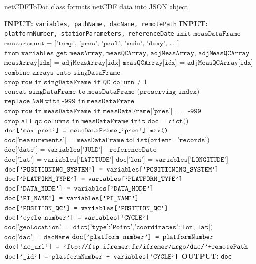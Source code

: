 \begin{algorithm}
\caption{netCDFToDoc class formats netCDF data into JSON object}\label{alg:netCDFToDoc}
\begin{algorithmic}[1]
\State \textbf{INPUT:} \texttt{variables, pathName, dacName, remotePath}
\State \textbf{INPUT:} \texttt{platformNumber, stationParameters, referenceDate}
\State $\texttt{init measDataFrame}$
\State $\texttt{measurement = ['temp', 'pres', 'psal', 'cndc', 'doxy', ... ]}$
\State $\texttt{from variables get measArray, measQCArray, adjMeasArray, adjMeasQCArray}$
\State $\texttt{measArray[idx] = adjMeasArray[idx]}$
\State $\texttt{measQCArray[idx] = adjMeasQCArray[idx]}$
\EndIf
\State $\texttt{combine arrays into singDataFrame}$
\EndLoop
\State $\texttt{drop row in singDataFrame if QC column} \neq 1$
\State $\texttt{concat singDataFrame to measDataFrame (preserving index)}$
\EndLoop
\State $\texttt{replace NaN with -999 in measDataFrame}$
\State $\texttt{drop row in measDataFrame if measDataFrame['pres'] == -999}$
\State $\texttt{drop all qc columns in measDataFrame}$
\State $\texttt{init doc = dict()}$
\State $\texttt{doc['max\textunderscore pres'] = measDataFrame['pres'].max()}$
\State $\texttt{doc['measurements'] = measDataFrame.toList(orient='records')}$
\State $\texttt{doc['date'] = variables['JULD'] - referenceDate}$
\State $\texttt{doc['lat'] = variables['LATITUDE']}$
\State $\texttt{doc['lon'] = variables['LONGITUDE']}$
\State $\texttt{doc['POSITIONING\textunderscore SYSTEM'] = variables['POSITIONING\textunderscore SYSTEM']}$
\State $\texttt{doc['PLATFORM\textunderscore TYPE'] = variables['PLATFORM\textunderscore TYPE']}$
\State $\texttt{doc['DATA\textunderscore MODE'] = variables['DATA\textunderscore MODE']}$
\State $\texttt{doc['PI\textunderscore NAME'] = variables['PI\textunderscore NAME']}$
\State $\texttt{doc['POSITION\textunderscore QC'] = variables['POSITION\textunderscore QC']}$
\State $\texttt{doc['cycle\textunderscore number'] = variables['CYCLE']}$
\State $\texttt{doc['geoLocation'] = dict('type':'Point','coordinates':[lon, lat])}$
\State $\texttt{doc['dac'] = dacName}$
\State $\texttt{doc['platform\textunderscore number'] = platformNumber}$
\State $\texttt{doc['nc\textunderscore url'] = 'ftp://ftp.ifremer.fr/ifremer/argo/dac/'+remotePath}$
\State $\texttt{doc['\textunderscore id'] = platformNumber + variables['CYCLE']}$
\State \textbf{OUTPUT:} \texttt{doc}
\EndProcedure
\end{algorithmic}
\end{algorithm}


